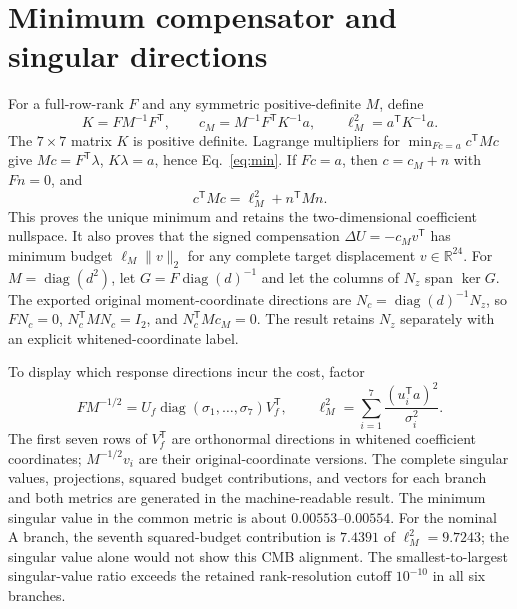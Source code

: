 \documentclass[aps,prd,onecolumn,11pt,nofootinbib,notitlepage]{revtex4-2}
\begin{document}
\section{Minimum compensator and singular directions}

For a full-row-rank $F$ and any symmetric positive-definite $M$, define
\begin{equation}
 K=FM^{-1}F^{\mathsf T},\qquad
 c_M=M^{-1}F^{\mathsf T}K^{-1}a,\qquad
 \ell_M^2=a^{\mathsf T}K^{-1}a.
 \label{eq:min}
\end{equation}
The $7\times7$ matrix $K$ is positive definite. Lagrange multipliers for $\min_{Fc=a}c^{\mathsf T}Mc$ give $Mc=F^{\mathsf T}\lambda$, $K\lambda=a$, hence Eq.~\eqref{eq:min}. If $Fc=a$, then $c=c_M+n$ with $Fn=0$, and
\begin{equation}
 c^{\mathsf T}Mc=\ell_M^2+n^{\mathsf T}Mn.
 \label{eq:orth}
\end{equation}
This proves the unique minimum and retains the two-dimensional coefficient nullspace. It also proves that the signed compensation $\Delta U=-c_M v^{\mathsf T}$ has minimum budget $\ell_M\|v\|_2$ for any complete target displacement $v\in\mathbb R^{24}$.
For $M=\operatorname{diag}(d^2)$, let $G=F\operatorname{diag}(d)^{-1}$ and let the columns of $N_z$ span $\ker G$. The exported original moment-coordinate directions are $N_c=\operatorname{diag}(d)^{-1}N_z$, so $FN_c=0$, $N_c^{\mathsf T}MN_c=I_2$, and $N_c^{\mathsf T}Mc_M=0$. The result retains $N_z$ separately with an explicit whitened-coordinate label.

To display which response directions incur the cost, factor
\begin{equation}
 FM^{-1/2}=U_f\operatorname{diag}(\sigma_1,\ldots,\sigma_7)V_f^{\mathsf T},
 \qquad
 \ell_M^2=\sum_{i=1}^{7}\frac{(u_i^{\mathsf T}a)^2}{\sigma_i^2}.
 \label{eq:svd}
\end{equation}
The first seven rows of $V_f^{\mathsf T}$ are orthonormal directions in whitened coefficient coordinates; $M^{-1/2}v_i$ are their original-coordinate versions. The complete singular values, projections, squared budget contributions, and vectors for each branch and both metrics are generated in the machine-readable result. The minimum singular value in the common metric is about $0.00553$--$0.00554$. For the nominal A branch, the seventh squared-budget contribution is $7.4391$ of $\ell_M^2=9.7243$; the singular value alone would not show this CMB alignment. The smallest-to-largest singular-value ratio exceeds the retained rank-resolution cutoff $10^{-10}$ in all six branches.
\end{document}
